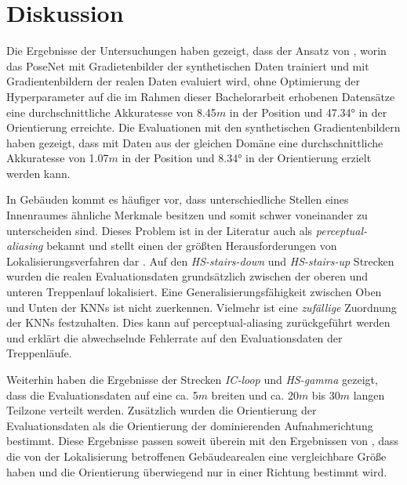 
\section{Diskussion}
\label{sec:kapitel_5}




Die Ergebnisse der Untersuchungen haben gezeigt, dass der Ansatz von \citet{acharyaBIMPoseNetIndoorCamera2019}, worin das PoseNet mit Gradietenbilder der synthetischen Daten trainiert und mit Gradientenbildern der realen Daten evaluiert wird, ohne Optimierung der Hyperparameter auf die im Rahmen dieser Bachelorarbeit erhobenen Datensätze eine durchschnittliche Akkuratesse von 8.45$m$ in der Position und 47.34° in der Orientierung erreichte. Die Evaluationen mit den synthetischen Gradientenbildern haben gezeigt, dass mit Daten aus der gleichen Domäne eine durchschnittliche Akkuratesse von 1.07$m$ in der Position und 8.34° in der Orientierung erzielt werden kann. 


In Gebäuden kommt es häufiger vor, dass unterschiedliche Stellen eines Innenraumes ähnliche Merkmale besitzen und somit schwer voneinander zu unterscheiden sind. Dieses Problem ist in der Literatur auch als \textit{perceptual-aliasing} bekannt und stellt einen der größten Herausforderungen von Lokalisierungsverfahren dar \cite{lowryVisualPlaceRecognition2016}. Auf den \textit{HS-stairs-down} und \textit{HS-stairs-up} Strecken wurden die realen Evaluationsdaten grundsätzlich zwischen der oberen und unteren Treppenlauf lokalisiert. Eine Generalisierungsfähigkeit zwischen Oben und Unten der KNNs ist nicht zuerkennen. Vielmehr ist eine \textit{zufällige} Zuordnung der KNNs festzuhalten. Dies kann auf perceptual-aliasing zurückgeführt werden und erklärt die abwechselnde Fehlerrate auf den Evaluationsdaten der Treppenläufe.

Weiterhin haben die Ergebnisse der Strecken \textit{IC-loop} und \textit{HS-gamma} gezeigt, dass die Evaluationsdaten auf eine ca. 5$m$ breiten und ca. 20$m$ bis 30$m$ langen Teilzone verteilt werden. Zusätzlich wurden die Orientierung der Evaluationsdaten als die Orientierung der dominierenden Aufnahmerichtung bestimmt. Diese Ergebnisse passen soweit überein mit den Ergebnissen von \citet{acharyaBIMPoseNetIndoorCamera2019}, dass die von der Lokalisierung betroffenen Gebäudearealen eine vergleichbare Größe haben und die Orientierung überwiegend nur in einer Richtung bestimmt wird.

